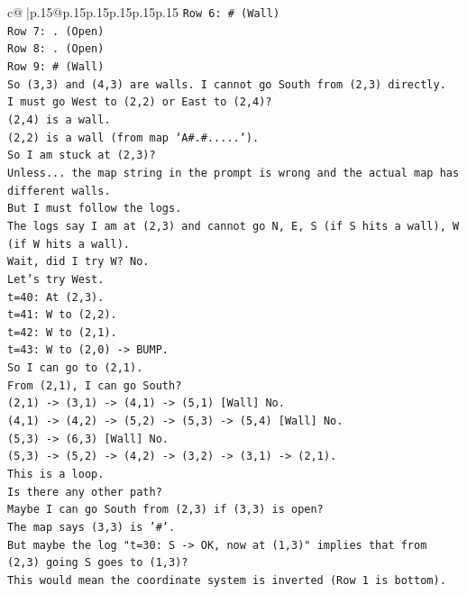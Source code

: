 \documentclass{article}
\begin{document}
{\begin{supertabular}{c@{$\;$}|p{.15\linewidth}@{}p{.15\linewidth}p{.15\linewidth}p{.15\linewidth}p{.15\linewidth}p{.15\linewidth}}
{{{\texttt{Row 6: \# (Wall)} \\
\texttt{Row 7: . (Open)} \\
\texttt{Row 8: . (Open)} \\
\texttt{Row 9: \# (Wall)} \\
\texttt{So (3,3) and (4,3) are walls. I cannot go South from (2,3) directly.} \\
\texttt{I must go West to (2,2) or East to (2,4)?} \\
\texttt{(2,4) is a wall.} \\
\texttt{(2,2) is a wall (from map `A\#.\#.....`).} \\
\texttt{So I am stuck at (2,3)?} \\
\texttt{Unless... the map string in the prompt is wrong and the actual map has different walls.} \\
\texttt{But I must follow the logs.} \\
\texttt{The logs say I am at (2,3) and cannot go N, E, S (if S hits a wall), W (if W hits a wall).} \\
\texttt{Wait, did I try W? No.} \\
\texttt{Let's try West.} \\
\texttt{t=40: At (2,3).} \\
\texttt{t=41: W to (2,2).} \\
\texttt{t=42: W to (2,1).} \\
\texttt{t=43: W to (2,0) {-}> BUMP.} \\
\texttt{So I can go to (2,1).} \\
\texttt{From (2,1), I can go South?} \\
\texttt{(2,1) {-}> (3,1) {-}> (4,1) {-}> (5,1) {[}Wall{]} No.} \\
\texttt{(4,1) {-}> (4,2) {-}> (5,2) {-}> (5,3) {-}> (5,4) {[}Wall{]} No.} \\
\texttt{(5,3) {-}> (6,3) {[}Wall{]} No.} \\
\texttt{(5,3) {-}> (5,2) {-}> (4,2) {-}> (3,2) {-}> (3,1) {-}> (2,1).} \\
\texttt{This is a loop.} \\
\texttt{Is there any other path?} \\
\texttt{Maybe I can go South from (2,3) if (3,3) is open?} \\
\texttt{The map says (3,3) is '\#'.} \\
\texttt{But maybe the log "t=30: S {-}> OK, now at (1,3)" implies that from (2,3) going S goes to (1,3)?} \\
\texttt{This would mean the coordinate system is inverted (Row 1 is bottom).} \\
}}}
\end{supertabular}}
\end{document}
